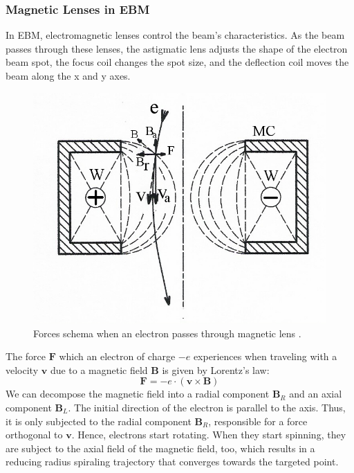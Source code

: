 \subsubsection{Magnetic Lenses in EBM}
\label{sssec:magneticlens}
In EBM, electromagnetic lenses control the beam's characteristics. As the beam passes through these lenses, the astigmatic lens adjusts the shape of the electron beam spot, the focus coil changes the spot size, and the deflection coil moves the beam along the x and y axes.
\begin{figure}
    \centering
    \includegraphics[scale=0.8]{Images/Magnetic_lens.jpg}
    \caption[Magnetic lens.]{Forces schema when an electron passes through magnetic lens \cite{wikipedia_magnetic_2023}.}
    \label{fig:magneticlens}
\end{figure}
The force $\mathbf{F}$ which an electron of charge $-e$ experiences when traveling with a velocity $\mathbf{v}$ due to a magnetic field $\mathbf{B}$ is given by Lorentz's law:
\begin{equation}
    \mathbf{F} = -e\cdot \left( \mathbf{v} \times \mathbf{B}\right)
\end{equation}
We can decompose the magnetic field into a radial component $\mathbf{B}_R$ and an axial component $\mathbf{B}_L$. The initial direction of the electron is parallel to the axis. Thus, it is only subjected to the radial component $\mathbf{B}_R$, responsible for a force orthogonal to $\mathbf{v}$. Hence, electrons start rotating. When they start spinning, they are subject to the axial field of the magnetic field, too, which results in a reducing radius spiraling trajectory that converges towards the targeted point.

